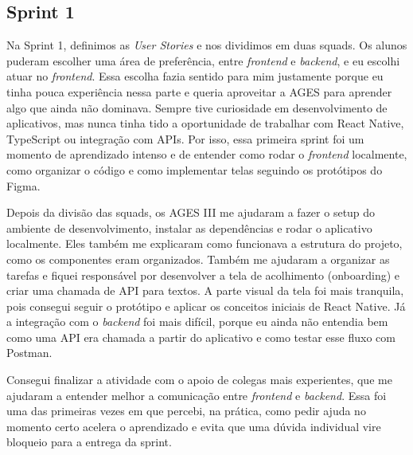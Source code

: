 \subsection{Sprint 1}

Na Sprint 1, definimos as \textit{User Stories} e nos dividimos em duas squads. Os alunos puderam escolher uma área de preferência, entre \textit{frontend} e \textit{backend}, e eu escolhi atuar no \textit{frontend}. Essa escolha fazia sentido para mim justamente porque eu tinha pouca experiência nessa parte e queria aproveitar a AGES para aprender algo que ainda não dominava. Sempre tive curiosidade em desenvolvimento de aplicativos, mas nunca tinha tido a oportunidade de trabalhar com React Native, TypeScript ou integração com APIs. Por isso, essa primeira sprint foi um momento de aprendizado intenso e de entender como rodar o \textit{frontend} localmente, como organizar o código e como implementar telas seguindo os protótipos do Figma.

Depois da divisão das squads, os AGES III me ajudaram a fazer o setup do ambiente de desenvolvimento, instalar as dependências e rodar o aplicativo localmente. Eles também me explicaram como funcionava a estrutura do projeto, como os componentes eram organizados. Também me ajudaram a organizar as tarefas e fiquei responsável por desenvolver a tela de acolhimento (onboarding) e criar uma chamada de API para textos. A parte visual da tela foi mais tranquila, pois consegui seguir o protótipo e aplicar os conceitos iniciais de React Native. Já a integração com o \textit{backend} foi mais difícil, porque eu ainda não entendia bem como uma API era chamada a partir do aplicativo e como testar esse fluxo com Postman.

Consegui finalizar a atividade com o apoio de colegas mais experientes, que me ajudaram a entender melhor a comunicação entre \textit{frontend} e \textit{backend}. Essa foi uma das primeiras vezes em que percebi, na prática, como pedir ajuda no momento certo acelera o aprendizado e evita que uma dúvida individual vire bloqueio para a entrega da sprint.
